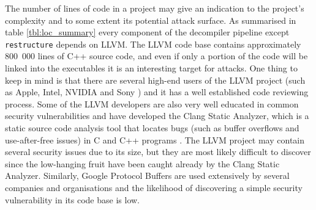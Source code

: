 The number of lines of code in a project may give an indication to the project's complexity and to some extent its potential attack surface. As summarised in table \ref{tbl:loc_summary} every component of the decompiler pipeline except \texttt{restructure} depends on LLVM. The LLVM code base contains approximately 800~000 lines of C++ source code, and even if only a portion of the code will be linked into the executables it is an interesting target for attacks. One thing to keep in mind is that there are several high-end users of the LLVM project (such as Apple, Intel, NVIDIA and Sony \cite{llvm_users}) and it has a well established code reviewing process. Some of the LLVM developers are also very well educated in common security vulnerabilities and have developed the Clang Static Analyzer, which is a static source code analysis tool that locates bugs (such as buffer overflows and use-after-free issues) in C and C++ programs \cite{clang_analyzer}. The LLVM project may contain several security issues due to its size, but they are most likely difficult to discover since the low-hanging fruit have been caught already by the Clang Static Analyzer. Similarly, Google Protocol Buffers are used extensively by several companies and organisations and the likelihood of discovering a simple security vulnerability in its code base is low.

